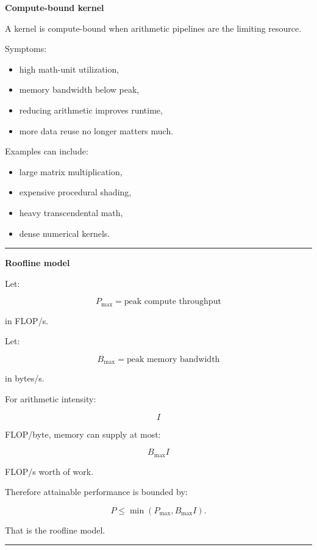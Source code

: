 \textbf{Compute-bound kernel}

A kernel is compute-bound when arithmetic pipelines are the limiting resource.

Symptoms:

\begin{itemize}
\tightlist
\item
  high math-unit utilization,
\item
  memory bandwidth below peak,
\item
  reducing arithmetic improves runtime,
\item
  more data reuse no longer matters much.
\end{itemize}

Examples can include:

\begin{itemize}
\tightlist
\item
  large matrix multiplication,
\item
  expensive procedural shading,
\item
  heavy transcendental math,
\item
  dense numerical kernels.
\end{itemize}

\begin{center}\rule{0.5\linewidth}{0.5pt}\end{center}

\textbf{Roofline model}

Let:

\[
P_{\max}
=
\text{peak compute throughput}
\]

in FLOP/s.

Let:

\[
B_{\max}
=
\text{peak memory bandwidth}
\]

in bytes/s.

For arithmetic intensity:

\[
I
\]

FLOP/byte, memory can supply at most:

\[
B_{\max}I
\]

FLOP/s worth of work.

Therefore attainable performance is bounded by:

\[
\boxed{
P
\le
\min(
P_{\max},
B_{\max}I
).
}
\]

That is the roofline model.

\begin{center}\rule{0.5\linewidth}{0.5pt}\end{center}

